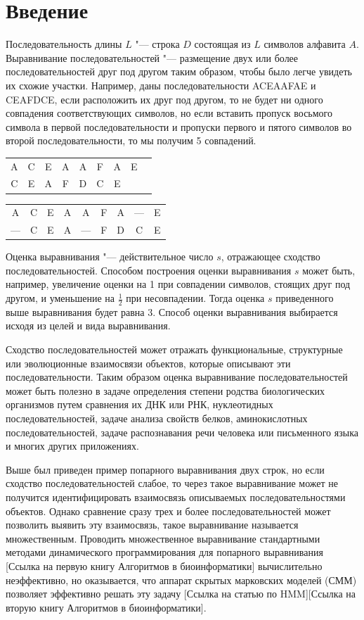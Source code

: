 \documentclass[]{article}
\begin{document}
	\section{Введение}
		Последовательность длины $L$ "--- строка $D$ состоящая из $L$ символов алфавита $A$. Выравнивание последовательностей  "--- размещение двух или более последовательностей друг под другом таким образом, чтобы было легче увидеть их схожие участки. Например, даны последовательности ACEAAFAE и CEAFDCE, если расположить их друг под другом, то не будет ни одного совпадения соответствующих символов, но если вставить пропуск восьмого символа в первой последовательности и пропуски первого и пятого символов во второй последовательности, то мы получим 5 совпадений.
		\begin{center}
			\begin{tabular}{ccccccccc}
				A&C&E&A&A&F&A&E\\
				C&E&A&F&D&C&E\\
			\end{tabular}
		\end{center}
			\begin{center}
				\begin{tabular}{ccccccccc}
				A&C&E&A&A&F&A&—&E\\
				—&C&E&A&—&F&D&C&E\\
			\end{tabular}
		\end{center}
		Оценка выравнивания "--- действительное число $s$, отражающее сходство последовательностей. Способом построения оценки выравнивания $s$ может быть, например, увеличение оценки на 1 при совпадении символов, стоящих друг под другом, и уменьшение на $\frac{1}{2}$ при несовпадении. Тогда оценка $s$ приведенного выше выравнивания будет равна 3. Способ оценки выравнивания выбирается исходя из целей и вида выравнивания.
		
		Сходство последовательностей может отражать функциональные, структурные или эволюционные взаимосвязи объектов, которые описывают эти последовательности. Таким образом оценка выравнивание последовательностей может быть полезно в задаче определения степени родства биологических организмов путем сравнения их ДНК или РНК, нуклеотидных последовательностей, задаче анализа свойств белков, аминокислотных последовательностей, задаче распознавания речи человека или письменного языка и многих других приложениях.
		
		Выше был приведен пример попарного выравнивания двух строк, но если сходство последовательностей слабое, то через такое выравнивание может не получится идентифицировать взаимосвязь описываемых последовательностями объектов. Однако сравнение сразу трех и более последовательностей может позволить выявить эту взаимосвязь, такое выравнивание называется множественным. Проводить множественное выравнивание стандартными методами динамического программирования для попарного выравнивания [Ссылка на первую книгу Алгоритмов в биоинформатики] вычислительно неэффективно, но оказывается, что аппарат скрытых марковских моделей (СММ) позволяет эффективно решать эту задачу [Ссылка на статью по HMM][Ссылка на вторую книгу Алгоритмов в биоинформатики]. 
		
\end{document}

